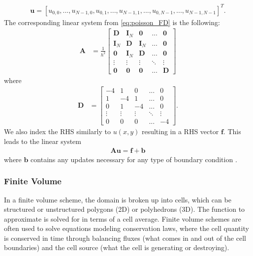 \begin{align}
    \textbf{u} = [u_{0,0}, ..., u_{N - 1, 0}, u_{0, 1}, ..., u_{N - 1, 1}, ..., u_{0, N - 1}, ..., u_{N - 1, N - 1}]^T.
\end{align}
The corresponding linear system from \ref{eq:poisson_FD} is the following:
\begin{align}
    \textbf{A} &= \frac{1}{h^2}
    \begin{bmatrix}
        \textbf{D} & \textbf{I}_{N} & \textbf{0} & ... & \textbf{0} \\
        \textbf{I}_{N} & \textbf{D} & \textbf{I}_{N} & ... & \textbf{0} \\
        \textbf{0} & \textbf{I}_{N} & \textbf{D} & ... & \textbf{0} \\
        \vdots & \vdots & \vdots & \ddots & \vdots \\
        \textbf{0} & \textbf{0} & \textbf{0} & ... & \textbf{D}
    \end{bmatrix}
\end{align}
where
\begin{align}
    \textbf{D} &= 
    \begin{bmatrix}
        -4 & 1 & 0 & ... & 0 \\
        1 & -4 & 1 & ... & 0 \\
        0 & 1 & -4 & ... & 0 \\
        \vdots & \vdots & \vdots & \ddots & \vdots \\
        0 & 0 & 0 & ... & -4
    \end{bmatrix}.
\end{align}
We also index the RHS similarly to $u(x,y)$ resulting in a RHS vector $\textbf{f}$. This leads to the linear system
\begin{align}
    \textbf{A} \textbf{u} = \textbf{f} + \textbf{b}
\end{align}
where $\textbf{b}$ contains any updates necessary for any type of boundary condition \citep{leveque2007finite}.

\subsubsection{Finite Volume}

In a finite volume scheme, the domain is broken up into cells, which can be structured or unstructured polygons (2D) or polyhedrons (3D). The function to approximate is solved for in terms of a cell average. Finite volume schemes are often used to solve equations modeling conservation laws, where the cell quantity is conserved in time through balancing fluxes (what comes in and out of the cell boundaries) and the cell source (what the cell is generating or destroying).

